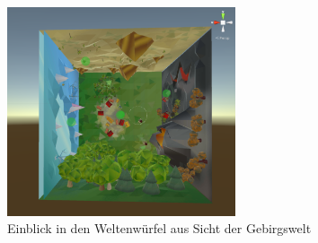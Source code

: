 

\begin{figure}[ht]%
	\centering
		\includegraphics[width=0.6\textwidth]{images/worlds}
	\caption{Einblick in den Weltenwürfel aus Sicht der Gebirgswelt}
	\label{fig:Worlds}
\end{figure}